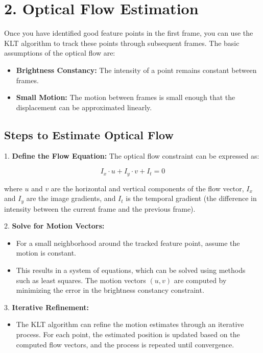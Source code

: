 \documentclass{article}
\begin{document}
\section{2. Optical Flow Estimation}
Once you have identified good feature points in the first frame, you can use the KLT algorithm to track these points through subsequent frames. The basic assumptions of the optical flow are:

\begin{itemize}
    \item \textbf{Brightness Constancy:} The intensity of a point remains constant between frames.
    \item \textbf{Small Motion:} The motion between frames is small enough that the displacement can be approximated linearly.
\end{itemize}

\subsection{Steps to Estimate Optical Flow}
1. \textbf{Define the Flow Equation:} The optical flow constraint can be expressed as:

\[
I_x \cdot u + I_y \cdot v + I_t = 0
\]

where \(u\) and \(v\) are the horizontal and vertical components of the flow vector, \(I_x\) and \(I_y\) are the image gradients, and \(I_t\) is the temporal gradient (the difference in intensity between the current frame and the previous frame).

2. \textbf{Solve for Motion Vectors:}
   \begin{itemize}
       \item For a small neighborhood around the tracked feature point, assume the motion is constant.
       \item This results in a system of equations, which can be solved using methods such as least squares. The motion vectors \((u, v)\) are computed by minimizing the error in the brightness constancy constraint.
   \end{itemize}

3. \textbf{Iterative Refinement:}
   \begin{itemize}
       \item The KLT algorithm can refine the motion estimates through an iterative process. For each point, the estimated position is updated based on the computed flow vectors, and the process is repeated until convergence.
   \end{itemize}
\end{document}
